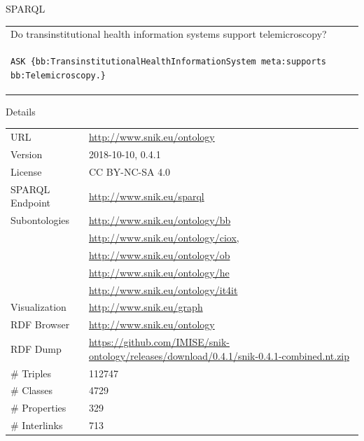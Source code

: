 \documentclass[portrait,final,a0paper,fontscale=0.310]{baposter}
\begin{document}
\begin{poster}
\begin{posterbox}[name=sparql,column=1,above=bottom]{SPARQL}
{\begin{tabular*}{\columnwidth}{l}
Do transinstitutional health information systems support telemicroscopy?\\
\begin{lstlisting}
ASK {bb:TransinstitutionalHealthInformationSystem meta:supports bb:Telemicroscopy.}
\end{lstlisting}
\end{tabular*}
}
\vspace{0.0em}
\end{posterbox}
\begin{posterbox}[name=source,column=1,above=sparql,below=background]{Details}
\begin{tabulary}{\columnwidth}{lL}
URL		&\url{http://www.snik.eu/ontology}\\
Version		&2018-10-10, 0.4.1\\
License		&CC BY-NC-SA 4.0\\
SPARQL Endpoint	&\url{http://www.snik.eu/sparql}\\
Subontologies	&\url{http://www.snik.eu/ontology/bb}\\
		&\url{http://www.snik.eu/ontology/ciox,}\\
		&\url{http://www.snik.eu/ontology/ob}\\
		&\url{http://www.snik.eu/ontology/he}\\
		&\url{http://www.snik.eu/ontology/it4it}\\
Visualization	&\url{http://www.snik.eu/graph}\\
RDF Browser	&\url{http://www.snik.eu/ontology}\\
RDF Dump	&\url{https://github.com/IMISE/snik-ontology/releases/download/0.4.1/snik-0.4.1-combined.nt.zip}\\
\# Triples	&\num{112747}\\
\# Classes	&\num{4729}\\
\# Properties	&\num{329}\\
\# Interlinks	&\num{713}\\
\end{tabulary}%
\end{posterbox}
\end{poster}
\end{document}
